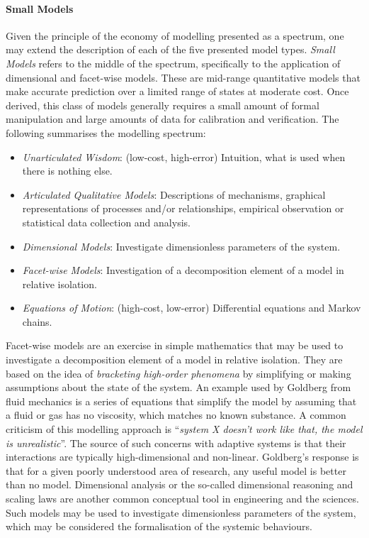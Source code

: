 %
%
\paragraph{Small Models} Given the principle of the economy of modelling presented as a spectrum, one may extend the description of each of the five presented model types. \emph{Small Models} refers to the middle of the spectrum, specifically to the application of dimensional and facet-wise models. These are mid-range quantitative models that make accurate prediction over a limited range of states at moderate cost. Once derived, this class of models generally requires a small amount of formal manipulation and large amounts of data for calibration and verification. The following summarises the modelling spectrum:

\begin{itemize}
	\item \emph{Unarticulated Wisdom}: (low-cost, high-error) Intuition, what is used when there is nothing else.
	\item \emph{Articulated Qualitative Models}: Descriptions of mechanisms, graphical representations of processes and/or relationships, empirical observation or statistical data collection and analysis.
	\item \emph{Dimensional Models}: Investigate dimensionless parameters of the system.
	\item \emph{Facet-wise Models}: Investigation of a decomposition element of a model in relative isolation.
	\item \emph{Equations of Motion}: (high-cost, low-error) Differential equations and Markov chains.
\end{itemize}

Facet-wise models are an exercise in simple mathematics that may be used to investigate a decomposition element of a model in relative isolation. They are based on the idea of \emph{bracketing high-order phenomena} by simplifying or making assumptions about the state of the system. An example used by Goldberg from fluid mechanics is a series of equations that simplify the model by assuming that a fluid or gas has no viscosity, which matches no known substance. A common criticism of this modelling approach is ``\emph{system X doesn't work like that, the model is unrealistic}''. The source of such concerns with adaptive systems is that their interactions are typically high-dimensional and non-linear. Goldberg's response is that for a given poorly understood area of research, any useful model is better than no model. Dimensional analysis or the so-called dimensional reasoning and scaling laws are another common conceptual tool in engineering and the sciences. Such models may be used to investigate dimensionless parameters of the system, which may be considered the formalisation of the systemic behaviours.

